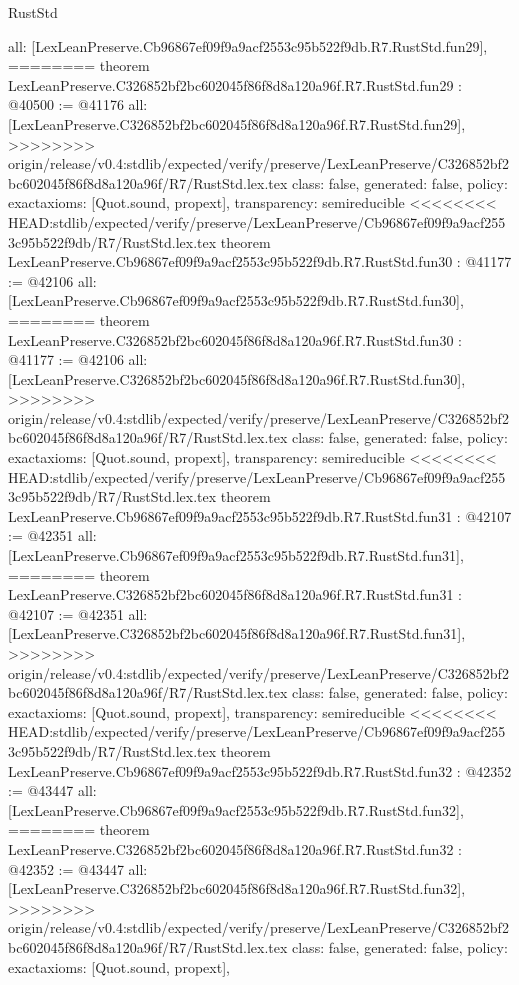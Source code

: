 \begin{lexlean}{RustStd}
\begin{coremodule}
{\begin{coremodule}
{{{{{{{{{{{{{{{{{{{{{{{{{{{{{{{{  all: [LexLeanPreserve.Cb96867ef09f9a9acf2553c95b522f9db.R7.RustStd.fun29],
========
theorem LexLeanPreserve.C326852bf2bc602045f86f8d8a120a96f.R7.RustStd.fun29 : @40500 := @41176 {
  all: [LexLeanPreserve.C326852bf2bc602045f86f8d8a120a96f.R7.RustStd.fun29],
>>>>>>>> origin/release/v0.4:stdlib/expected/verify/preserve/LexLeanPreserve/C326852bf2bc602045f86f8d8a120a96f/R7/RustStd.lex.tex
  class: false,
  generated: false,
  policy: exact{axioms: [Quot.sound, propext]},
  transparency: semireducible
}
<<<<<<<< HEAD:stdlib/expected/verify/preserve/LexLeanPreserve/Cb96867ef09f9a9acf2553c95b522f9db/R7/RustStd.lex.tex
theorem LexLeanPreserve.Cb96867ef09f9a9acf2553c95b522f9db.R7.RustStd.fun30 : @41177 := @42106 {
  all: [LexLeanPreserve.Cb96867ef09f9a9acf2553c95b522f9db.R7.RustStd.fun30],
========
theorem LexLeanPreserve.C326852bf2bc602045f86f8d8a120a96f.R7.RustStd.fun30 : @41177 := @42106 {
  all: [LexLeanPreserve.C326852bf2bc602045f86f8d8a120a96f.R7.RustStd.fun30],
>>>>>>>> origin/release/v0.4:stdlib/expected/verify/preserve/LexLeanPreserve/C326852bf2bc602045f86f8d8a120a96f/R7/RustStd.lex.tex
  class: false,
  generated: false,
  policy: exact{axioms: [Quot.sound, propext]},
  transparency: semireducible
}
<<<<<<<< HEAD:stdlib/expected/verify/preserve/LexLeanPreserve/Cb96867ef09f9a9acf2553c95b522f9db/R7/RustStd.lex.tex
theorem LexLeanPreserve.Cb96867ef09f9a9acf2553c95b522f9db.R7.RustStd.fun31 : @42107 := @42351 {
  all: [LexLeanPreserve.Cb96867ef09f9a9acf2553c95b522f9db.R7.RustStd.fun31],
========
theorem LexLeanPreserve.C326852bf2bc602045f86f8d8a120a96f.R7.RustStd.fun31 : @42107 := @42351 {
  all: [LexLeanPreserve.C326852bf2bc602045f86f8d8a120a96f.R7.RustStd.fun31],
>>>>>>>> origin/release/v0.4:stdlib/expected/verify/preserve/LexLeanPreserve/C326852bf2bc602045f86f8d8a120a96f/R7/RustStd.lex.tex
  class: false,
  generated: false,
  policy: exact{axioms: [Quot.sound, propext]},
  transparency: semireducible
}
<<<<<<<< HEAD:stdlib/expected/verify/preserve/LexLeanPreserve/Cb96867ef09f9a9acf2553c95b522f9db/R7/RustStd.lex.tex
theorem LexLeanPreserve.Cb96867ef09f9a9acf2553c95b522f9db.R7.RustStd.fun32 : @42352 := @43447 {
  all: [LexLeanPreserve.Cb96867ef09f9a9acf2553c95b522f9db.R7.RustStd.fun32],
========
theorem LexLeanPreserve.C326852bf2bc602045f86f8d8a120a96f.R7.RustStd.fun32 : @42352 := @43447 {
  all: [LexLeanPreserve.C326852bf2bc602045f86f8d8a120a96f.R7.RustStd.fun32],
>>>>>>>> origin/release/v0.4:stdlib/expected/verify/preserve/LexLeanPreserve/C326852bf2bc602045f86f8d8a120a96f/R7/RustStd.lex.tex
  class: false,
  generated: false,
  policy: exact{axioms: [Quot.sound, propext]},
}}}}}}}}}}}}}}}}}}}}}}}}}}}}}}}}}}}}
\end{coremodule}}
\end{coremodule}
\end{lexlean}
